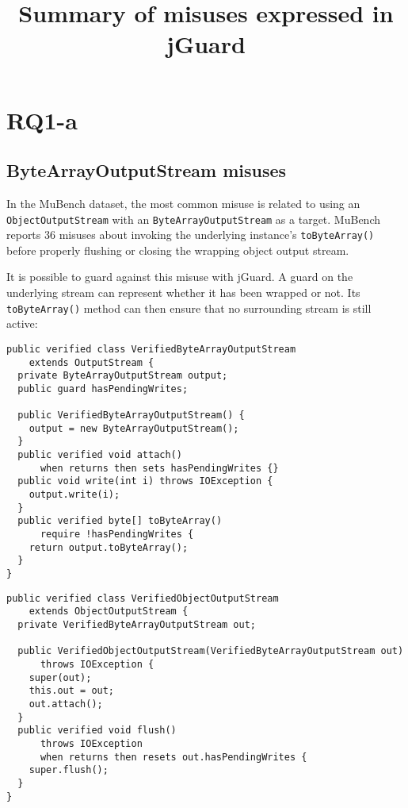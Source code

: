 \documentclass{article}
\title{Summary of misuses expressed in jGuard}
\begin{document}
\maketitle


\section{RQ1-a}

\subsection{ByteArrayOutputStream misuses}

In the MuBench dataset, the most common misuse is related to using an \texttt{Object\allowbreak Output\allowbreak Stream}
with an \texttt{ByteArrayOutputStream} as a target.
MuBench reports 36 misuses about invoking the underlying instance's \texttt{toByteArray()} before
properly flushing or closing the wrapping object output stream.

It is possible to guard against this misuse with jGuard.
A guard on the underlying stream can represent whether it has been wrapped or not.
Its \texttt{toByteArray()} method can then ensure that no surrounding stream is still active:


\begin{minipage}[t]{0.5\textwidth}
\begin{lstlisting}[style=jGuard, basicstyle=\tiny]
public verified class VerifiedByteArrayOutputStream
    extends OutputStream {
  private ByteArrayOutputStream output;
  public guard hasPendingWrites;

  public VerifiedByteArrayOutputStream() {
    output = new ByteArrayOutputStream();
  }
  public verified void attach() 
      when returns then sets hasPendingWrites {}
  public void write(int i) throws IOException {
    output.write(i);
  }
  public verified byte[] toByteArray() 
      require !hasPendingWrites {
    return output.toByteArray();
  }
}
\end{lstlisting}
\end{minipage}
\begin{minipage}[t]{0.5\textwidth}
\begin{lstlisting}[style=jGuard, basicstyle=\tiny]
public verified class VerifiedObjectOutputStream
    extends ObjectOutputStream { 
  private VerifiedByteArrayOutputStream out; 
     
  public VerifiedObjectOutputStream(VerifiedByteArrayOutputStream out)
      throws IOException { 
    super(out); 
    this.out = out; 
    out.attach(); 
  } 
  public verified void flush()
      throws IOException
      when returns then resets out.hasPendingWrites { 
    super.flush(); 
  } 
}
\end{lstlisting}
\end{minipage}
\end{document}
